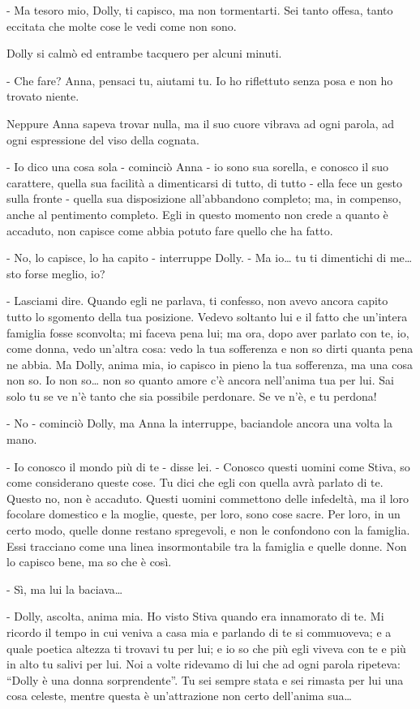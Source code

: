 - Ma tesoro mio, Dolly, ti capisco, ma non tormentarti. Sei tanto offesa, tanto eccitata che molte cose le vedi come non sono. 

Dolly si calmò ed entrambe tacquero per alcuni minuti. 

- Che fare? Anna, pensaci tu, aiutami tu. Io ho riflettuto senza posa e non ho trovato niente. 

Neppure Anna sapeva trovar nulla, ma il suo cuore vibrava ad ogni parola, ad ogni espressione del viso della cognata. 

- Io dico una cosa sola - cominciò Anna - io sono sua sorella, e conosco il suo carattere, quella sua facilità a dimenticarsi di tutto, di tutto - ella fece un gesto sulla fronte - quella sua disposizione all'abbandono completo; ma, in compenso, anche al pentimento completo. Egli in questo momento non crede a quanto è accaduto, non capisce come abbia potuto fare quello che ha fatto. 

- No, lo capisce, lo ha capito - interruppe Dolly. - Ma io\ldots{} tu ti dimentichi di me\ldots{} sto forse meglio, io? 

- Lasciami dire. Quando egli ne parlava, ti confesso, non avevo ancora capito tutto lo sgomento della tua posizione. Vedevo soltanto lui e il fatto che un'intera famiglia fosse sconvolta; mi faceva pena lui; ma ora, dopo aver parlato con te, io, come donna, vedo un'altra cosa: vedo la tua sofferenza e non so dirti quanta pena ne abbia. Ma Dolly, anima mia, io capisco in pieno la tua sofferenza, ma una cosa non so. Io non so\ldots{} non so quanto amore c'è ancora nell'anima tua per lui. Sai solo tu se ve n'è tanto che sia possibile perdonare. Se ve n'è, e tu perdona! 

- No - cominciò Dolly, ma Anna la interruppe, baciandole ancora una volta la mano. 

- Io conosco il mondo più di te - disse lei. - Conosco questi uomini come Stiva, so come considerano queste cose. Tu dici che egli con quella avrà parlato di te. Questo no, non è accaduto. Questi uomini commettono delle infedeltà, ma il loro focolare domestico e la moglie, queste, per loro, sono cose sacre. Per loro, in un certo modo, quelle donne restano spregevoli, e non le confondono con la famiglia. Essi tracciano come una linea insormontabile tra la famiglia e quelle donne. Non lo capisco bene, ma so che è così. 

- Sì, ma lui la baciava\ldots{} 

- Dolly, ascolta, anima mia. Ho visto Stiva quando era innamorato di te. Mi ricordo il tempo in cui veniva a casa mia e parlando di te si commuoveva; e a quale poetica altezza ti trovavi tu per lui; e io so che più egli viveva con te e più in alto tu salivi per lui. Noi a volte ridevamo di lui che ad ogni parola ripeteva: ``Dolly è una donna sorprendente''. Tu sei sempre stata e sei rimasta per lui una cosa celeste, mentre questa è un'attrazione non certo dell'anima sua\ldots{} 

